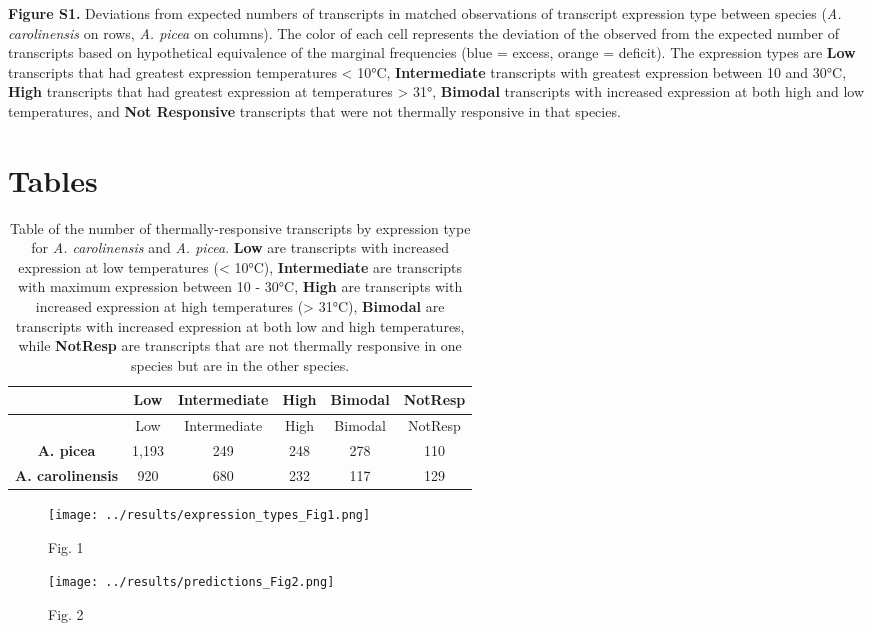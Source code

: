 \documentclass[]{article}
\begin{document}
\textbf{Figure S1.} Deviations from expected numbers of transcripts in
matched observations of transcript expression type between species
(\emph{A. carolinensis} on rows, \emph{A. picea} on columns). The color
of each cell represents the deviation of the observed from the expected
number of transcripts based on hypothetical equivalence of the marginal
frequencies (blue = excess, orange = deficit). The expression types are
\textbf{Low} transcripts that had greatest expression temperatures
\textless{} 10°C, \textbf{Intermediate} transcripts with greatest
expression between 10 and 30°C, \textbf{High} transcripts that had
greatest expression at temperatures \textgreater{} 31°, \textbf{Bimodal}
transcripts with increased expression at both high and low temperatures,
and \textbf{Not Responsive} transcripts that were not thermally
responsive in that species.

\newpage

\section{Tables}\label{tables}

\begin{longtable}[c]{@{}cccccc@{}}
\caption{Table of the number of thermally-responsive transcripts by
expression type for \emph{A. carolinensis} and \emph{A. picea}.
\textbf{Low} are transcripts with increased expression at low
temperatures (\textless{} 10°C), \textbf{Intermediate} are transcripts
with maximum expression between 10 - 30°C, \textbf{High} are transcripts
with increased expression at high temperatures (\textgreater{} 31°C),
\textbf{Bimodal} are transcripts with increased expression at both low
and high temperatures, while \textbf{NotResp} are transcripts that are
not thermally responsive in one species but are in the other
species.}\tabularnewline
\toprule
~ & Low & Intermediate & High & Bimodal & NotResp\tabularnewline
\midrule
\endfirsthead
\toprule
~ & Low & Intermediate & High & Bimodal & NotResp\tabularnewline
\midrule
\endhead
\textbf{A. picea} & 1,193 & 249 & 248 & 278 & 110\tabularnewline
\textbf{A. carolinensis} & 920 & 680 & 232 & 117 & 129\tabularnewline
\bottomrule
\end{longtable}

\begin{figure}[htbp]
\centering
\texttt{[image: ../results/expression\_types\_Fig1.png]}
\caption{Fig. 1}
\end{figure}

\begin{figure}[htbp]
\centering
\texttt{[image: ../results/predictions\_Fig2.png]}
\caption{Fig. 2}
\end{figure}
\end{document}
